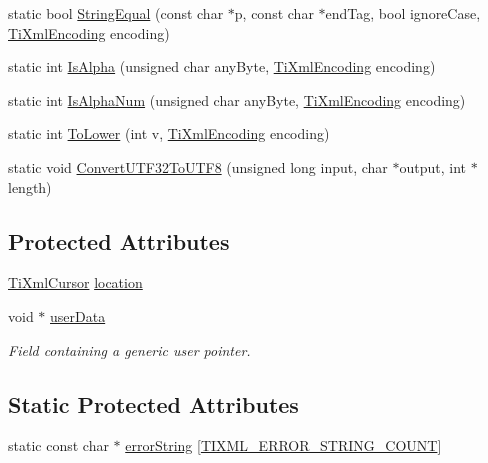 \begin{DoxyCompactItemize}
\item 
static bool \hyperlink{class_ti_xml_base_a51631e6986179558b9e5850723ed165a}{String\-Equal} (const char $\ast$p, const char $\ast$end\-Tag, bool ignore\-Case, \hyperlink{tinyxml_8h_a88d51847a13ee0f4b4d320d03d2c4d96}{Ti\-Xml\-Encoding} encoding)
\item 
static int \hyperlink{class_ti_xml_base_ae22522b2e8e1ac43102d16394f639fc8}{Is\-Alpha} (unsigned char any\-Byte, \hyperlink{tinyxml_8h_a88d51847a13ee0f4b4d320d03d2c4d96}{Ti\-Xml\-Encoding} encoding)
\item 
static int \hyperlink{class_ti_xml_base_a321919055c115c78ded17f85a793f368}{Is\-Alpha\-Num} (unsigned char any\-Byte, \hyperlink{tinyxml_8h_a88d51847a13ee0f4b4d320d03d2c4d96}{Ti\-Xml\-Encoding} encoding)
\item 
static int \hyperlink{class_ti_xml_base_a799f17405a86a5c2029618e85f11a097}{To\-Lower} (int v, \hyperlink{tinyxml_8h_a88d51847a13ee0f4b4d320d03d2c4d96}{Ti\-Xml\-Encoding} encoding)
\item 
static void \hyperlink{class_ti_xml_base_a07c765e3a7f979d343e646ea797b180b}{Convert\-U\-T\-F32\-To\-U\-T\-F8} (unsigned long input, char $\ast$output, int $\ast$length)
\end{DoxyCompactItemize}
\subsection*{Protected Attributes}
\begin{DoxyCompactItemize}
\item 
\hyperlink{struct_ti_xml_cursor}{Ti\-Xml\-Cursor} \hyperlink{class_ti_xml_base_a0d992580f3bc264909f898e942677a3c}{location}
\item 
void $\ast$ \hyperlink{class_ti_xml_base_ab242c01590191f644569fa89a080d97c}{user\-Data}
\begin{DoxyCompactList}\small\item\em Field containing a generic user pointer. \end{DoxyCompactList}\end{DoxyCompactItemize}
\subsection*{Static Protected Attributes}
\begin{DoxyCompactItemize}
\item 
static const char $\ast$ \hyperlink{class_ti_xml_base_a7ac8feec4100e446b3d78e1ac0659700}{error\-String} \mbox{[}\hyperlink{class_ti_xml_base_ab251e9d7b9102b9aedb2fdaed2ecfe55a14552894942250efcec6b00dc52fc48a}{T\-I\-X\-M\-L\-\_\-\-E\-R\-R\-O\-R\-\_\-\-S\-T\-R\-I\-N\-G\-\_\-\-C\-O\-U\-N\-T}\mbox{]}
\end{DoxyCompactItemize}
